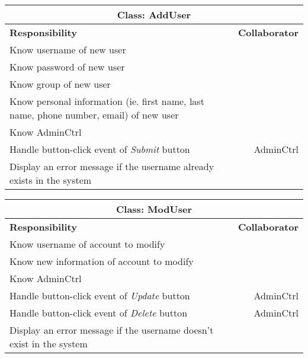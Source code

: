 \documentclass[12pt]{article}
\begin{document}
\begin{center}
\begin{tabularx}{\textwidth}{|X|r|} \hline
\multicolumn{2}{|c|}{\textbf{Class: AddUser}}\\ \hline
\textbf{Responsibility} & \textbf{Collaborator} \\ \hline
Know username of new user & \\ \hline
Know password of new user & \\ \hline
Know group of new user & \\ \hline
Know personal information (ie. first name, last name, phone number, email) of new user & \\ \hline
Know AdminCtrl &  \\ \hline
Handle button-click event of \emph{Submit} button & AdminCtrl \\ \hline
 Display an error message if the username already exists in the system& \\ \hline
\end{tabularx}
\newline\newline
\end{center}

\begin{center}
\begin{tabularx}{\textwidth}{|X|r|} \hline
\multicolumn{2}{|c|}{\textbf{Class: ModUser}}\\ \hline
\textbf{Responsibility} & \textbf{Collaborator} \\ \hline
Know username of account to modify             &                                  \\ \hline
Know new information of account to modify           &                                   \\ \hline
Know AdminCtrl           &                                   \\ \hline
Handle button-click event of \emph{Update} button & AdminCtrl \\ \hline
Handle button-click event of \emph{Delete} button & AdminCtrl \\ \hline
 Display an error message if the username doesn't exist in the system& \\ \hline
\end{tabularx}
\newline\newline
\end{center}
\end{document}
